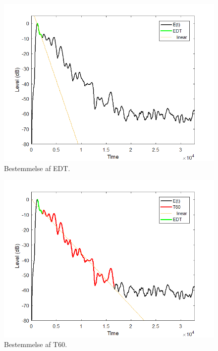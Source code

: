 \begin{figure} [H]
	\centering
	\includegraphics[width=\linewidth]{graphics/50.png}
	\caption{Bestemmelse af EDT.}
	\label{fig:50}
\end{figure}


\begin{figure} [H]
	\centering
	\includegraphics[width=\linewidth]{graphics/51.png}
	\caption{Bestemmelse af T60.}
	\label{fig:51}
\end{figure}


